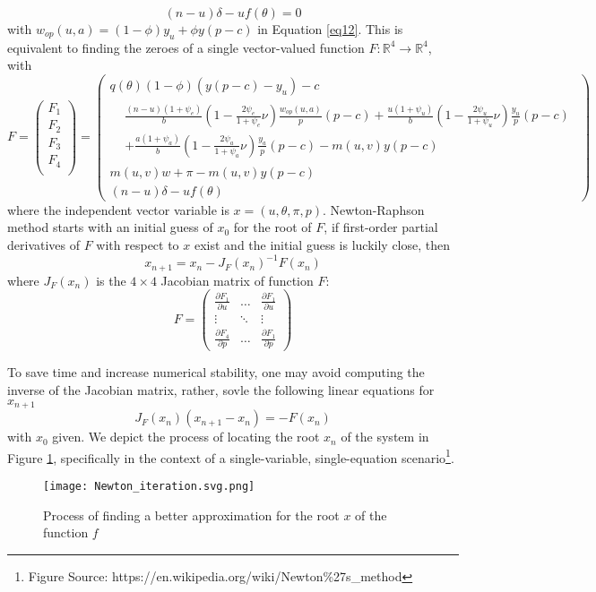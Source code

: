 \documentclass[ %
    final,
    scrbook,
    listoffigures,
    listoftables, 
    glossary]{cu-thesis}
\begin{document}
   \begin{equation}   
    (n-u)\delta-uf(\theta) = 0
   \end{equation}
with $w_{op}(u,a)=(1-\phi)y_u+\phi y(p-c)$ in Equation \ref{eq12}. This is equivalent to finding the zeroes of a single vector-valued function $F: \mathbb{R}^4\rightarrow \mathbb{R}^4$, with $$
F = \begin{pmatrix}
F_{1}\\
F_{2}\\
F_{3}\\
F_{4}\\
\end{pmatrix}=\begin{pmatrix}
q(\theta)(1-\phi)(y(p-c)-y_u)-c\\
\begin{split}
&\frac{(n-u)(1+\psi_e)}{b}(1-\frac{2\psi_e}{1+\psi_e}\nu)\frac{w_{op}(u,a)}{p}(p-c)+\frac{u(1+\psi_u)}{b}(1-\frac{2\psi_u}{1+\psi_u}\nu)\frac{y_u}{p}(p-c)\\
&+\frac{a(1+\psi_a)}{b}(1-\frac{2\psi_a}{1+\psi_a}\nu)\frac{y_a}{p}(p-c)-m(u,v)y(p-c)
\end{split}\\
m(u,v)w+\pi-m(u,v)y(p-c)\\
(n-u)\delta-uf(\theta)
\end{pmatrix}$$ where the independent vector variable is $x=(u, \theta, \pi, p)$. Newton-Raphson method starts with an initial guess of $x_0$ for the root of $F$, if first-order partial derivatives of $F$ with respect to $x$ exist and the initial guess is luckily close, then
$$x_{n+1}=x_{n} - J_{F}(x_{n})^{-1}F(x_{n})$$
where $J_{F}(x_{n})$ is the $4\times4$ Jacobian matrix of function $F$:
$$F=\begin{pmatrix}
    \frac{\partial F_1}{\partial u}  & \dots & \frac{\partial F_1}{\partial u}\\
    \vdots & \ddots & \vdots\\
    \frac{\partial F_4}{\partial p}  & \dots & \frac{\partial F_1}{\partial p}
\end{pmatrix}$$

To save time and increase numerical stability, one may avoid computing the inverse of the Jacobian matrix, rather, sovle the following linear equations for $x_{n+1}$
$$J_{F}(x_{n})(x_{n+1} - x_{n}) = - F(x_{n})$$
with $x_0$ given.
We depict the process of locating the root $x_n$ of the system in Figure \ref{figNR}, specifically in the context of a single-variable, single-equation scenario\footnote{Figure Source: https://en.wikipedia.org/wiki/Newton\%27s\_method}.
\begin{figure}[h]
\centering
\texttt{[image: Newton\_iteration.svg.png]}
\caption{Process of finding a better approximation for the root $x$ of the function $f$}
\label{figNR}
\end{figure}
\end{document}
